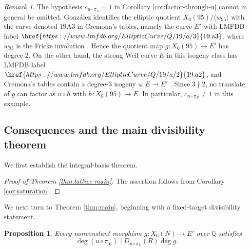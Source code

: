 \documentclass[12pt, letterpaper]{amsart}
\newtheorem{proposition}[theorem]{Proposition}
\theoremstyle{definition}
\theoremstyle{remark}
\newtheorem{remark}[theorem]{Remark}
\newcommand{\Q}{\mathbb Q}
\numberwithin{equation}{section}
\begin{document}
\begin{remark}
The hypothesis \(c_{u\circ\pi_E}=1\) in Corollary
\ref{cor:factor-through-u} cannot in general be omitted. Gonz\'alez identifies
the elliptic quotient \(X_0(95)/\langle w_{95}\rangle\) with the curve denoted
\(19\mathrm{A}3\) in Cremona's tables, namely the curve \(E'\) with LMFDB label
\(\href{https://www.lmfdb.org/EllipticCurve/Q/19/a/3}{19.\mathrm{a}3}\), where
\(w_{95}\) is the Fricke involution
\cite[Table~2]{GonzalezBielliptic}. Hence the quotient map
\(g:X_0(95)\to E'\) has degree \(2\). On the other hand, the strong Weil curve
\(E\) in this isogeny class has LMFDB label
\(\href{https://www.lmfdb.org/EllipticCurve/Q/19/a/2}{19.\mathrm{a}2}\), and
Cremona's tables contain a degree-\(3\) isogeny \(u:E\to E'\)
\cite[Chapter~IV, Table~1]{CremonaAlgorithms}. Since \(3\nmid2\), no translate
of \(g\) can factor as \(u\circ h\) with \(h:X_0(95)\to E\). In particular,
\(c_{u\circ\pi_E}\ne1\) in this example.
\end{remark}

\subsection{Consequences and the main divisibility theorem}

We first establish the integral-basis theorem.

\begin{proof}[Proof of Theorem \ref{thm:lattice-main}]
The assertion follows from Corollary \ref{cor:saturation}.
\end{proof}

We next turn to Theorem \ref{thm:main}, beginning with a
fixed-target divisibility statement.

\begin{proposition}\label{prop:fixed-target-degree}
Every nonconstant morphism \(g:X_0(N)\to E'\) over \(\Q\) satisfies
\[
        \deg(u\circ\pi_E)\mid D_{u\circ\pi_E}(R)\deg g .
\]
\end{proposition}
\end{document}
